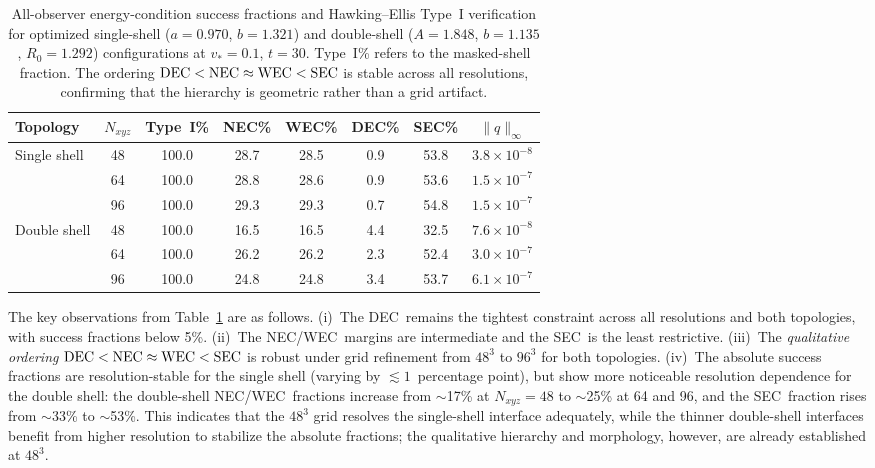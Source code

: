 \documentclass[11pt]{article}
\makeatletter
\newcommand{\@abbr}[1]{\ifmmode\mathrm{#1}\else\textsc{#1}\fi}
\newcommand{\WEC}{\@abbr{WEC}}
\newcommand{\NEC}{\@abbr{NEC}}
\newcommand{\SEC}{\@abbr{SEC}}
\newcommand{\DEC}{\@abbr{DEC}}
\makeatother
\begin{document}
\begin{table}[htbp]
\centering
\caption{All-observer energy-condition success fractions and Hawking--Ellis Type~I verification for optimized single-shell ($a=0.970$, $b=1.321$) and double-shell ($A=1.848$, $b=1.135$, $R_0=1.292$) configurations at $v_*=0.1$, $t=30$. Type~I\% refers to the masked-shell fraction. The ordering $\DEC < \NEC \approx \WEC < \SEC$ is stable across all resolutions, confirming that the hierarchy is geometric rather than a grid artifact.}
\label{tab:summary}
\vspace{0.5ex}
\begin{tabular}{l c c c c c c c}
\hline\hline
Topology & $N_{xyz}$ & Type~I\% & \NEC\% & \WEC\% & \DEC\% & \SEC\% & $\|q\|_\infty$ \\
\hline
Single shell & 48 & 100.0 & 28.7 & 28.5 & \phantom{0}0.9 & 53.8 & $3.8\times10^{-8}$ \\
             & 64 & 100.0 & 28.8 & 28.6 & \phantom{0}0.9 & 53.6 & $1.5\times10^{-7}$ \\
             & 96 & 100.0 & 29.3 & 29.3 & \phantom{0}0.7 & 54.8 & $1.5\times10^{-7}$ \\
\hline
Double shell & 48 & 100.0 & 16.5 & 16.5 & \phantom{0}4.4 & 32.5 & $7.6\times10^{-8}$ \\
             & 64 & 100.0 & 26.2 & 26.2 & \phantom{0}2.3 & 52.4 & $3.0\times10^{-7}$ \\
             & 96 & 100.0 & 24.8 & 24.8 & \phantom{0}3.4 & 53.7 & $6.1\times10^{-7}$ \\
\hline\hline
\end{tabular}
\end{table}

The key observations from Table~\ref{tab:summary} are as follows. (i)~The \DEC\ remains the tightest constraint across all resolutions and both topologies, with success fractions below 5\%. (ii)~The \NEC/\WEC\ margins are intermediate and the \SEC\ is the least restrictive. (iii)~The \emph{qualitative ordering} $\DEC < \NEC \approx \WEC < \SEC$ is robust under grid refinement from $48^3$ to $96^3$ for both topologies. (iv)~The absolute success fractions are resolution-stable for the single shell (varying by $\lesssim 1$~percentage point), but show more noticeable resolution dependence for the double shell: the double-shell \NEC/\WEC\ fractions increase from $\sim$17\% at $N_{xyz}=48$ to $\sim$25\% at 64 and 96, and the \SEC\ fraction rises from $\sim$33\% to $\sim$53\%. This indicates that the $48^3$ grid resolves the single-shell interface adequately, while the thinner double-shell interfaces benefit from higher resolution to stabilize the absolute fractions; the qualitative hierarchy and morphology, however, are already established at $48^3$.
\end{document}
